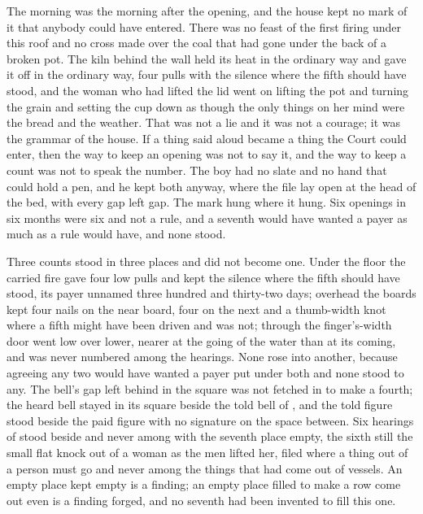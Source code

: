 The morning was the morning after the opening, and the house kept no mark of it that anybody could have entered. There was no feast of the first firing under this roof and no cross made over the coal that had gone under the back of a broken pot. The kiln behind the wall held its heat in the ordinary way and gave it off in the ordinary way, four pulls with the silence where the fifth should have stood, and the woman who had lifted the lid went on lifting the pot and turning the grain and setting the cup down as though the only things on her mind were the bread and the weather. That was not a lie and it was not a courage; it was the grammar of the house. If a thing said aloud became a thing the Court could enter, then the way to keep an opening was not to say it, and the way to keep a count was not to speak the number. The boy had no slate and no hand that could hold a pen, and he kept both anyway, where the file lay open at the head of the bed, with every gap left gap. The mark hung where it hung. Six openings in six months were six and not a rule, and a seventh would have wanted a payer as much as a rule would have, and none stood.

\scenebreak

Three counts stood in three places and did not become one. Under the floor the carried fire gave four low pulls and kept the silence where the fifth should have stood, its payer unnamed three hundred and thirty-two days; overhead the boards kept four nails on the near board, four on the next and a thumb-width knot where a fifth might have been driven and was not; through the finger's-width door  went low over lower, nearer at the going of the water than at its coming, and was never numbered among the hearings. None rose into another, because agreeing any two would have wanted a payer put under both and none stood to any. The bell's gap left behind in the square was not fetched in to make a fourth; the heard bell stayed in its square beside the told bell of , and the told figure stood beside the paid figure with no signature on the space between. Six hearings of  stood beside and never among with the seventh place empty, the sixth still the small flat knock out of a woman as the men lifted her, filed where a thing out of a person must go and never among the things that had come out of vessels. An empty place kept empty is a finding; an empty place filled to make a row come out even is a finding forged, and no seventh had been invented to fill this one.

